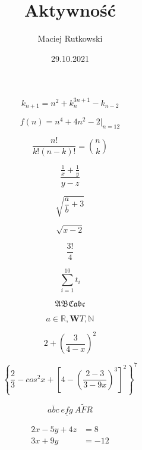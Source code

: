 \documentclass[12pt,legalpaper,notitlepage]{article}
\date{29.10.2021}
\author{Maciej Rutkowski}
\title{Aktywność}
\begin{document}
\maketitle

$$k_{n+1}= n^2+k^{3n+1}_n-k_{n-2}$$
 
$$f(n)=n^4+4n^2-2|_{n=12}$$
 
$$\frac {n!} {k!(n-k)!}=\binom{n}{k}$$
 
$$\frac {\frac {1} {x}+ \frac {1}{y}} {y-z}$$
 
$$\sqrt {\frac {a} {b} + 3}$$
 
$$\sqrt {x-2}$$
 
$$\frac {3!} {4}$$
 
$$\sum_{i=1}^{10} t_i$$
 
$$\mathfrak{ABCabc}$$
 
$$ a\in \mathbb{R}, \mathbf{W} T,\mathbb{N} $$
 
$$2+\left(\frac{3}{4-x}\right)^2$$
 
$$\left\{\frac {2}{3}-cos^2x+\left[4-\left(\frac{2-3}{3-9x}\right)^3\right]^2\right\}^7$$

$$\overline{abc} \ \underline{efg}
\ \widetilde{AFR}$$

\begin{align*}
2x - 5y + 4z &= 8 \\
3x + 9y &= -12
\end{align*}
\end{document}
